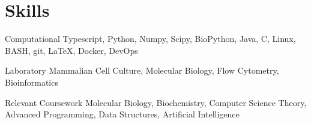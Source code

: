 \documentclass{bscv}
\begin{document}
\section{Skills}

\begin{factlist}

\item{Computational}
     {Typescript, Python, Numpy, Scipy, BioPython, Java, C, Linux, BASH, git, \LaTeX, Docker, DevOps}

\item{Laboratory}
  { Mammalian Cell Culture, Molecular Biology, Flow Cytometry, Bioinformatics }

\item{Relevant Coursework}
 {Molecular Biology, Biochemistry, Computer Science Theory, Advanced Programming, Data Structures, Artificial Intelligence }
\end{factlist}
  
\end{document}
